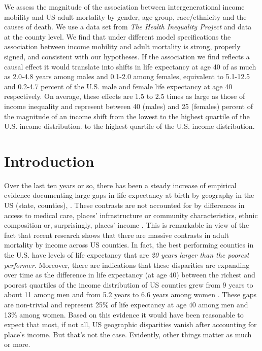 \documentclass[11pt]{article}
\begin{document}
We assess the magnitude of the association between intergenerational income mobility and US adult mortality by gender, age group, race/ethnicity and the causes of death. We use a data set from \textit{The Health Inequality Project} and  data at the county level. We find that under different model specifications the association between income mobility and adult mortality is strong, properly signed, and consistent with our hypotheses. If the association we find reflects a causal effect it would translate into shifts in life expectancy at age 40 of as much as 2.0-4.8 years among males and 0.1-2.0 among females, equivalent to 5.1-12.5 and 0.2-4.7 percent of the U.S. male and female life expectancy at age 40 respectively. On average, these effects are 1.5 to 2.5 times as large as those of income inequality and represent between 40 (males) and 25 (females) percent of the magnitude of an income shift from the lowest to the highest quartile of the U.S. income distribution. to the highest quartile of the U.S. income distribution.

\newpage
\setcounter{page}{1}


\section{Introduction}

Over the last ten years or so, there has been a steady increase of empirical evidence documenting large gaps in life expectancy at birth by geography in the US (state, counties), \citep{Murray2006, Ezzati2008}. These contrasts are not accounted for by differences in access to medical care, places' infrastructure or community characteristics, ethnic composition or, surprisingly,  places' income \citep{NationalAcademyofSciences2015}. This is remarkable in view of the fact that recent research shows that there are massive contrasts in adult mortality by income across US counties. In fact, the best performing counties in the U.S. have levels of life expectancy that are \textit{20 years larger than the poorest performer}. Moreover, there are indications that these disparities are expanding over time as the difference in life expectancy (at age 40) between the richest and poorest quartiles of the income distribution of US counties grew from 9 years to about 11 among men and from 5.2 years to 6.6 years among women \citep{Chetty2016}. These gaps are non-trivial and represent 25\% of life expectancy at age 40 among men and 13\% among women. Based on this evidence it would have been reasonable to expect that most, if not all, US geographic disparities vanish after accounting for place's income. But that's not the case. Evidently, other things matter as much or more. 
\end{document}

